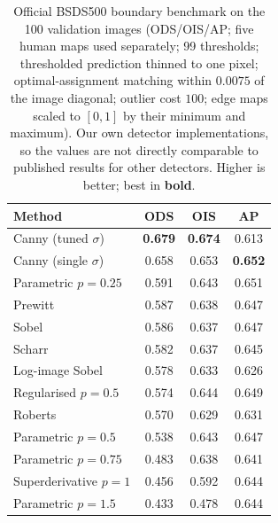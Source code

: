\documentclass[conference]{IEEEtran}
\begin{document}
\begin{table}[!t]
\centering
\footnotesize
\caption{Official BSDS500 boundary benchmark on the 100 validation images
(ODS/OIS/AP; five human maps used separately; 99 thresholds; thresholded
prediction thinned to one pixel; optimal-assignment matching within $0.0075$ of
the image diagonal; outlier cost $100$; edge maps scaled to $[0,1]$ by their
minimum and maximum).  Our own detector implementations, so the values are not
directly comparable to published results for other detectors.  Higher is better;
best in \textbf{bold}.}
\label{tab:bsds}
\begin{tabular}{@{}lccc@{}}
\toprule
Method & ODS & OIS & AP \\
\midrule
Canny (tuned $\sigma$)     & \textbf{0.679} & \textbf{0.674} & 0.613 \\
Canny (single $\sigma$)     & 0.658 & 0.653 & \textbf{0.652} \\
Parametric $p=0.25$         & 0.591 & 0.643 & 0.651 \\
Prewitt                     & 0.587 & 0.638 & 0.647 \\
Sobel                       & 0.586 & 0.637 & 0.647 \\
Scharr                      & 0.582 & 0.637 & 0.645 \\
Log-image Sobel             & 0.578 & 0.633 & 0.626 \\
Regularised $p=0.5$          & 0.574 & 0.644 & 0.649 \\
Roberts                     & 0.570 & 0.629 & 0.631 \\
Parametric $p=0.5$           & 0.538 & 0.643 & 0.647 \\
Parametric $p=0.75$          & 0.483 & 0.638 & 0.641 \\
Superderivative $p=1$       & 0.456 & 0.592 & 0.644 \\
Parametric $p=1.5$           & 0.433 & 0.478 & 0.644 \\
\bottomrule
\end{tabular}
\end{table}
\end{document}
